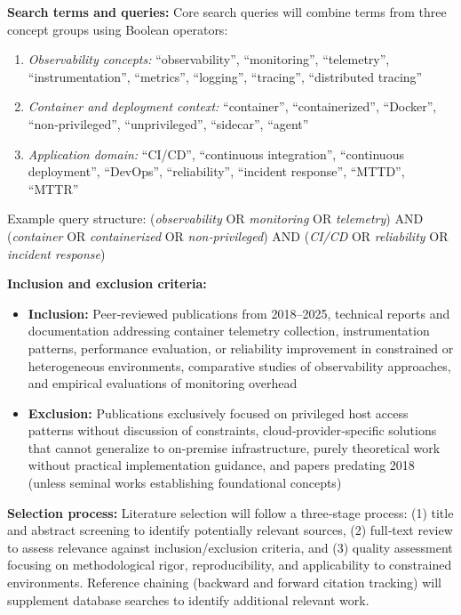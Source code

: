 \documentclass[12pt]{article}
\begin{document}
\textbf{Search terms and queries:}
Core search queries will combine terms from three concept groups using Boolean operators:
\begin{enumerate}
    \item \textit{Observability concepts:} ``observability'', ``monitoring'', ``telemetry'', ``instrumentation'', ``metrics'', ``logging'', ``tracing'', ``distributed tracing''
    \item \textit{Container and deployment context:} ``container'', ``containerized'', ``Docker'', ``non‑privileged'', ``unprivileged'', ``sidecar'', ``agent''
    \item \textit{Application domain:} ``CI/CD'', ``continuous integration'', ``continuous deployment'', ``DevOps'', ``reliability'', ``incident response'', ``MTTD'', ``MTTR''
\end{enumerate}

Example query structure: (\textit{observability} OR \textit{monitoring} OR \textit{telemetry}) AND (\textit{container} OR \textit{containerized} OR \textit{non‑privileged}) AND (\textit{CI/CD} OR \textit{reliability} OR \textit{incident response})

\textbf{Inclusion and exclusion criteria:}
\begin{itemize}
    \item \textbf{Inclusion:} Peer‑reviewed publications from 2018–2025, technical reports and documentation addressing container telemetry collection, instrumentation patterns, performance evaluation, or reliability improvement in constrained or heterogeneous environments, comparative studies of observability approaches, and empirical evaluations of monitoring overhead
    \item \textbf{Exclusion:} Publications exclusively focused on privileged host access patterns without discussion of constraints, cloud‑provider‑specific solutions that cannot generalize to on‑premise infrastructure, purely theoretical work without practical implementation guidance, and papers predating 2018 (unless seminal works establishing foundational concepts)
\end{itemize}

\textbf{Selection process:}
Literature selection will follow a three‑stage process: (1) title and abstract screening to identify potentially relevant sources, (2) full‑text review to assess relevance against inclusion/exclusion criteria, and (3) quality assessment focusing on methodological rigor, reproducibility, and applicability to constrained environments. Reference chaining (backward and forward citation tracking) will supplement database searches to identify additional relevant work.
\end{document}
